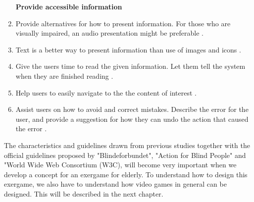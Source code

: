 \begin{enumerate}[{g}.1]
\textbf{Provide accessible information}
\item Provide alternatives for how to present information. For those who are visually impaired, an audio presentation might be preferable \cite{blindeforbundetTekst} \cite{w3cTekst}. 
\item Text is a better way to present information than use of images and icons \cite{w3cTekst}.
\item Give the users time to read the given information. Let them tell the system when they are finished reading \cite{w3cTekst}.  
\item Help users to easily navigate to the the content of interest \cite{w3cTekst}.
\item Assist users on how to avoid and correct mistakes. Describe the error for the user, and provide a suggestion for how they can undo the action that caused the error \cite{w3cTekst}.      
\end{enumerate} 

The characteristics and guidelines drawn from previous studies together with the official guidelines proposed by "Blindeforbundet", "Action for Blind People" and "World Wide Web Consortium (W3C), will become very important  when we develop a concept for an exergame for elderly. To understand how to design this exergame, we also have to understand how video games in general can be designed. This will be described in the next chapter.




